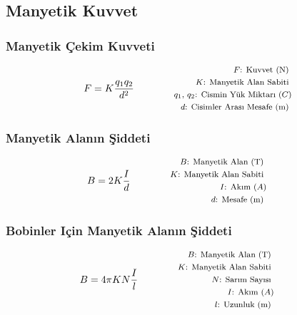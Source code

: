 \subsection{Manyetik Kuvvet}

\subsubsection*{Manyetik Çekim Kuvveti}
\begin{equation}
    F = K\frac{q_1 q_2}{d^2} \qquad \qquad \parbox{4cm}{\footnotesize$\begin{aligned}
        F\text{: Kuvvet (N) } \\
        K\text{: Manyetik Alan Sabiti } \\
        q_1\text{, }q_2\text{: Cismin Yük Miktarı } (C) \\
        d\text{: Cisimler Arası Mesafe (m) }
\end{aligned}$}
\end{equation}

\subsubsection*{Manyetik Alanın Şiddeti}
\begin{equation}
    B = 2 K \frac{I}{d} \qquad \qquad \parbox{4cm}{\footnotesize$\begin{aligned}
        B\text{: Manyetik Alan (T) } \\
        K\text{: Manyetik Alan Sabiti } \\
        I\text{: Akım } (A) \\
        d\text{: Mesafe (m) }
\end{aligned}$}
\end{equation}

\subsubsection*{Bobinler Için Manyetik Alanın Şiddeti}
\begin{equation}
    B = 4\pi K  N \frac{I}{l} \qquad \qquad \parbox{4cm}{\footnotesize$\begin{aligned}
        B\text{: Manyetik Alan (T) } \\
        K\text{: Manyetik Alan Sabiti } \\
        N\text{: Sarım Sayısı } \\
        I\text{: Akım } (A) \\
        l\text{: Uzunluk (m) }
\end{aligned}$}
\end{equation}

